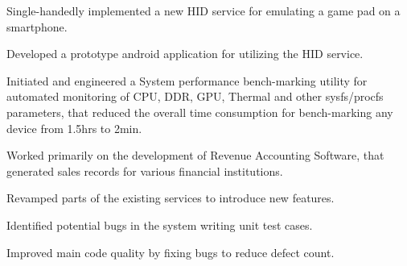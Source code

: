 \documentclass[]{kushal-resume}
\begin{document}
\begin{minipage}[t]{0.66\textwidth}
\begin{tightemize}
\item Single-handedly implemented a new HID  service for emulating a game pad on a smartphone.
\item Developed a prototype android application for utilizing the HID service.
\item Initiated and engineered a System performance bench-marking utility for automated monitoring of CPU, DDR, GPU, Thermal and other sysfs/procfs parameters, that reduced the overall time consumption for bench-marking any device from 1.5hrs to 2min.
\end{tightemize}
\sectionsep

\begin{tightemize}
\item Worked primarily on the development of Revenue Accounting Software, that generated
 sales records for various financial institutions.
 \item Revamped parts of the existing services to introduce new features. 
 \item Identified potential bugs in the system writing unit test cases.
 \item Improved main code quality by fixing bugs to reduce defect count.
\end{tightemize}
\sectionsep


\end{minipage} 
\end{document}
